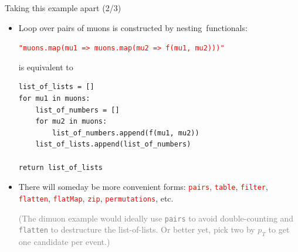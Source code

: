 \documentclass{beamer}
\begin{document}
\begin{frame}[fragile]{Taking this example apart (2/3)}
\vspace{0.3 cm}
\begin{itemize}\setlength{\itemsep}{0.5 cm}
\item Loop over pairs of muons is constructed by \mbox{nesting functionals:\hspace{-1 cm}}

\mbox{\tt\small \textcolor{red}{"muons.map(mu1 => muons.map(mu2 => f(mu1, mu2)))"}\hspace{-1 cm}}

is equivalent to

\begin{center}
\begin{minipage}{0.7\linewidth}
\scriptsize
\begin{verbatim}
list_of_lists = []
for mu1 in muons:
    list_of_numbers = []
    for mu2 in muons:
        list_of_numbers.append(f(mu1, mu2))
    list_of_lists.append(list_of_numbers)

return list_of_lists
\end{verbatim}
\end{minipage}
\end{center}

\item There will someday be more convenient forms: \textcolor{red}{\tt pairs}, \textcolor{red}{\tt table}, \textcolor{red}{\tt filter}, \textcolor{red}{\tt flatten}, \textcolor{red}{\tt flatMap}, \textcolor{red}{\tt zip}, \textcolor{red}{\tt permutations}, etc.

\vspace{0.2 cm}
\textcolor{gray}{(The dimuon example would ideally use \textcolor{lightred}{\tt pairs} to avoid double-counting and \textcolor{lightred}{\tt flatten} to destructure the list-of-lists. Or better yet, pick two by $p_T$ to get one candidate per event.)}
\end{itemize}
\end{frame}
\end{document}
